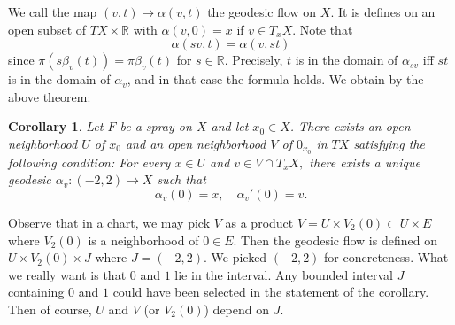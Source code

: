 \documentclass[a5paper,10pt,twoside]{article}
\newcommand{\R}{\ensuremath{\mathbb{R}}}
\theoremstyle{plain}
\newtheorem{cor}[teo]{Corollary}
\theoremstyle{definition}
\theoremstyle{remark}
\begin{document}
We call the map $(v,t)\mapsto\alpha(v,t)$ the geodesic flow on $X.$ It is defines on an open subset of $TX\times\R$ with $\alpha(v,0)=x$ if $v\in T_xX.$ Note that
$$
\alpha(sv,t)=\alpha(v,st)
$$
since $\pi\left(s\beta_v(t)\right)=\pi\beta_v(t)$ for $s\in\R$. Precisely, $t$ is in the domain of $\alpha_{sv}$ iff $st$ is in the domain of $\alpha_v$, and in that case the formula holds. We obtain by the above theorem:

\begin{cor}
Let $F$ be a spray on $X$ and let $x_0\in X$. There exists an open neighborhood $U$ of $x_0$ and an open neighborhood $V$ of $0_{x_0}$ in $TX$ satisfying the following condition: For every $x\in U$ and $v\in V\cap T_xX,$ there exists a unique geodesic $\alpha_v:(-2,2)\to X$ such that 
$$
\alpha_v(0)=x,\quad \alpha_v'(0)=v.
$$
\end{cor}

Observe that in a chart, we may pick $V$ as a product $V=U\times V_2(0)\subset U\times E$ where $V_2(0)$ is a neighborhood of $0\in E$. Then the geodesic flow is defined on $U\times V_2(0)\times J $ where $J=(-2,2)$. We picked $(-2, 2)$ for concreteness. What we really want is that $0$ and $1$ lie in the interval. Any bounded interval $J$ containing $0$ and $1$ could have been selected in the statement of the corollary. Then of course, $U$ and $V$ (or $V_2(0)$) depend on $J.$
\end{document}
